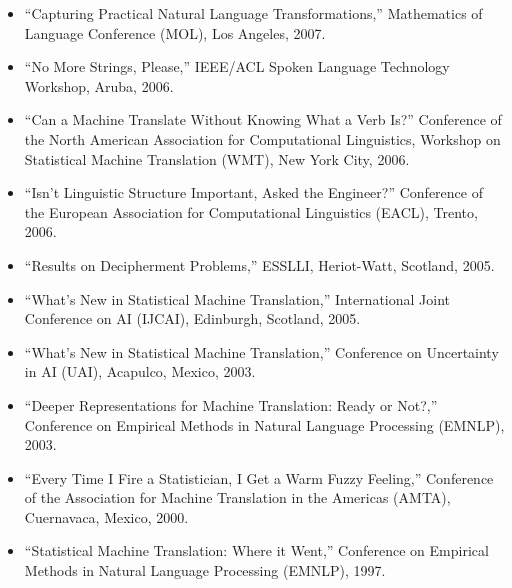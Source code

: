 \begin{itemize}
\item ``Capturing Practical Natural Language Transformations,'' Mathematics of Language Conference (MOL), Los Angeles, 2007.
\item ``No More Strings, Please,'' IEEE/ACL Spoken Language Technology Workshop, Aruba, 2006.
\item ``Can a Machine Translate Without Knowing What a Verb Is?'' Conference of the North American Association for Computational Linguistics, Workshop on Statistical Machine Translation (WMT), New York City, 2006.
\item ``Isn't Linguistic Structure Important, Asked the Engineer?'' Conference of the European Association for Computational Linguistics (EACL), Trento, 2006.
\item ``Results on Decipherment Problems,'' ESSLLI, Heriot-Watt, Scotland, 2005.
\item ``What's New in Statistical Machine Translation,'' International Joint Conference on AI (IJCAI), Edinburgh, Scotland, 2005.
\item ``What's New in Statistical Machine Translation,'' Conference on Uncertainty in AI (UAI), Acapulco, Mexico, 2003.
\item ``Deeper Representations for Machine Translation: Ready or Not?,'' Conference on Empirical Methods in Natural Language Processing (EMNLP), 2003.
\item ``Every Time I Fire a Statistician, I Get a Warm Fuzzy Feeling,'' Conference of the Association for Machine Translation in the Americas (AMTA), Cuernavaca, Mexico, 2000.
\item ``Statistical Machine Translation: Where it Went,'' Conference on Empirical Methods in Natural Language Processing (EMNLP), 1997.
\end{itemize}



